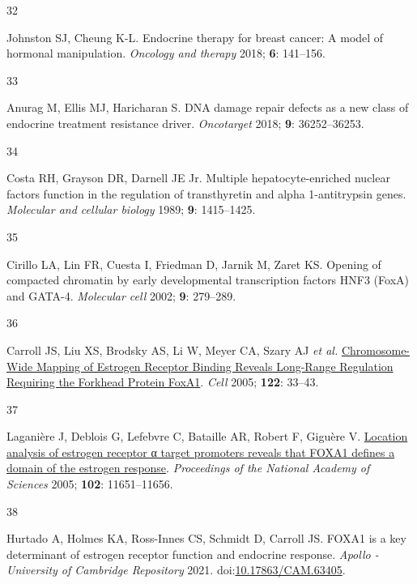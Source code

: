 \documentclass[
  12pt,
]{article}
\newlength{\cslhangindent}
\newlength{\csllabelwidth}
\newlength{\cslentryspacingunit} %
\newenvironment{CSLReferences}[2] %
 {%
  \setlength{\parindent}{0pt}
  \ifodd #1
  \let\oldpar\par
  \def\par{\hangindent=\cslhangindent\oldpar}
  \fi
  \setlength{\parskip}{#2\cslentryspacingunit}
 }%
 {}
\newcommand{\CSLLeftMargin}[1]{\parbox[t]{\csllabelwidth}{#1}}
\newcommand{\CSLRightInline}[1]{\parbox[t]{\linewidth - \csllabelwidth}{#1}\break}
\begin{document}
\begin{CSLReferences}{0}{0}
\leavevmode{}%
\CSLLeftMargin{32 }%
\CSLRightInline{Johnston SJ, Cheung K-L. Endocrine therapy for breast cancer: A model of hormonal manipulation. \emph{Oncology and therapy} 2018; \textbf{6}: 141--156.}

\leavevmode{}%
\CSLLeftMargin{33 }%
\CSLRightInline{Anurag M, Ellis MJ, Haricharan S. {DNA} damage repair defects as a new class of endocrine treatment resistance driver. \emph{Oncotarget} 2018; \textbf{9}: 36252--36253.}

\leavevmode{}%
\CSLLeftMargin{34 }%
\CSLRightInline{Costa RH, Grayson DR, Darnell JE Jr. Multiple hepatocyte-enriched nuclear factors function in the regulation of transthyretin and alpha 1-antitrypsin genes. \emph{Molecular and cellular biology} 1989; \textbf{9}: 1415--1425.}

\leavevmode{}%
\CSLLeftMargin{35 }%
\CSLRightInline{Cirillo LA, Lin FR, Cuesta I, Friedman D, Jarnik M, Zaret KS. Opening of compacted chromatin by early developmental transcription factors {HNF3} ({FoxA}) and {GATA-4}. \emph{Molecular cell} 2002; \textbf{9}: 279--289.}

\leavevmode{}%
\CSLLeftMargin{36 }%
\CSLRightInline{Carroll JS, Liu XS, Brodsky AS, Li W, Meyer CA, Szary AJ \emph{et al.} \href{https://doi.org/10.1016/j.cell.2005.05.008}{Chromosome-Wide Mapping of Estrogen Receptor Binding Reveals Long-Range Regulation Requiring the Forkhead Protein FoxA1}. \emph{Cell} 2005; \textbf{122}: 33--43.}

\leavevmode{}%
\CSLLeftMargin{37 }%
\CSLRightInline{Laganière J, Deblois G, Lefebvre C, Bataille AR, Robert F, Giguère V. \href{https://doi.org/10.1073/pnas.0505575102}{Location analysis of estrogen receptor α target promoters reveals that FOXA1 defines a domain of the estrogen response}. \emph{Proceedings of the National Academy of Sciences} 2005; \textbf{102}: 11651--11656.}

\leavevmode{}%
\CSLLeftMargin{38 }%
\CSLRightInline{Hurtado A, Holmes KA, Ross-Innes CS, Schmidt D, Carroll JS. FOXA1 is a key determinant of estrogen receptor function and endocrine response. \emph{Apollo - University of Cambridge Repository} 2021. doi:\href{https://doi.org/10.17863/CAM.63405}{10.17863/CAM.63405}.}


\end{CSLReferences}
\end{document}
